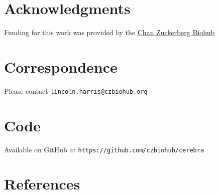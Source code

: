 \documentclass{article}
\begin{document}
\section*{Acknowledgments}
{Funding for this work was provided by the \href{https://www.czbiohub.org/}{Chan Zuckerberg Biohub}}

\section*{Correspondence}
{Please contact \texttt{lincoln.harris@czbiohub.org}}

\section*{Code}
{Available on GitHub at \texttt{https://github.com/czbiohub/cerebra}}

\section*{References}
\end{document}
